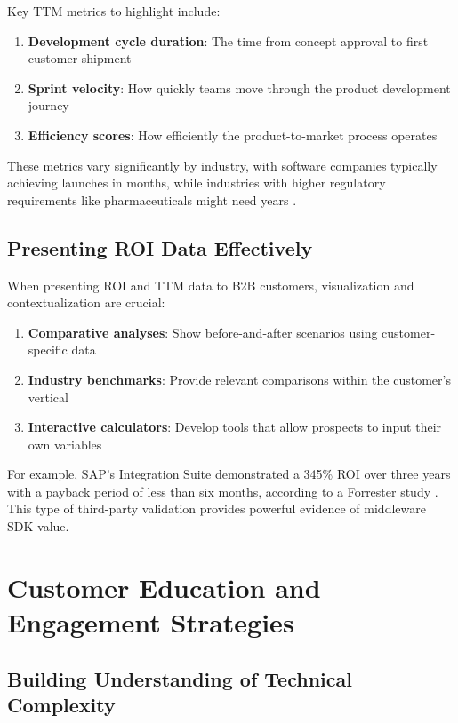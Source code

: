 \documentclass[11pt,a4paper]{article}
\begin{document}
Key TTM metrics to highlight include:

\begin{enumerate}
    \item \textbf{Development cycle duration}: The time from concept approval to first customer shipment
    \item \textbf{Sprint velocity}: How quickly teams move through the product development journey
    \item \textbf{Efficiency scores}: How efficiently the product-to-market process operates
\end{enumerate}

These metrics vary significantly by industry, with software companies typically achieving launches in months, while industries with higher regulatory requirements like pharmaceuticals might need years \cite{enkonix2023}.

\subsection{Presenting ROI Data Effectively}

When presenting ROI and TTM data to B2B customers, visualization and contextualization are crucial:

\begin{enumerate}
    \item \textbf{Comparative analyses}: Show before-and-after scenarios using customer-specific data
    \item \textbf{Industry benchmarks}: Provide relevant comparisons within the customer's vertical
    \item \textbf{Interactive calculators}: Develop tools that allow prospects to input their own variables
\end{enumerate}

For example, SAP's Integration Suite demonstrated a 345\% ROI over three years with a payback period of less than six months, according to a Forrester study \cite{sap2024}. This type of third-party validation provides powerful evidence of middleware SDK value.

\section{Customer Education and Engagement Strategies}

\subsection{Building Understanding of Technical Complexity}
\end{document}
